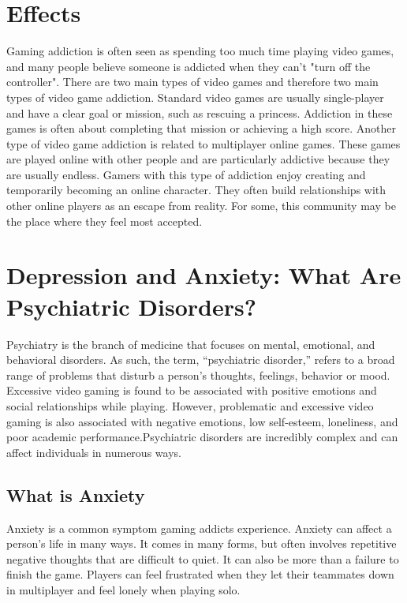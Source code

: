 \documentclass[10pt,twoside,slovak,a4paper]{article}
\begin{document}
\section{Effects} 
Gaming addiction is often seen as spending too much time playing video games,
and many people believe someone is addicted when they can't "turn off the controller".
There are two main types of video games and therefore two main types of video game addiction. Standard video games are usually single-player and have a clear goal or mission, such as rescuing a princess. Addiction in these games is often about completing that mission or achieving a high score. Another type of video game addiction is related to multiplayer online games. These games are played online with other people and are particularly addictive because they are usually endless. Gamers with this type of addiction enjoy creating and temporarily becoming an online character. They often build relationships with other online players as an escape from reality. For some, this community may be the place where they feel most accepted.

\newpage

\section{Depression and Anxiety: What Are Psychiatric Disorders?}
Psychiatry is the branch of medicine that focuses on mental, emotional, and behavioral disorders\cite{healthygamer.gg}. As such, the term, “psychiatric disorder,” refers to a broad range of problems that disturb a person's thoughts, feelings, behavior or mood.
Excessive video gaming is found to be associated with positive emotions and social relationships while playing. \newline However, problematic and excessive video gaming is also associated with negative emotions, low self-esteem, loneliness, and poor academic performance.Psychiatric disorders are incredibly complex and can affect individuals in numerous ways.

\subsection{What is Anxiety} \label{ina:este}
Anxiety is a common symptom gaming addicts experience. Anxiety can affect a person's life in many ways\cite{wired.com}. It comes in many forms, but often involves repetitive negative thoughts that are difficult to quiet. It can also be more than a failure to finish the game. Players can feel frustrated when they let their teammates down in multiplayer and feel lonely when playing solo.
\end{document}
